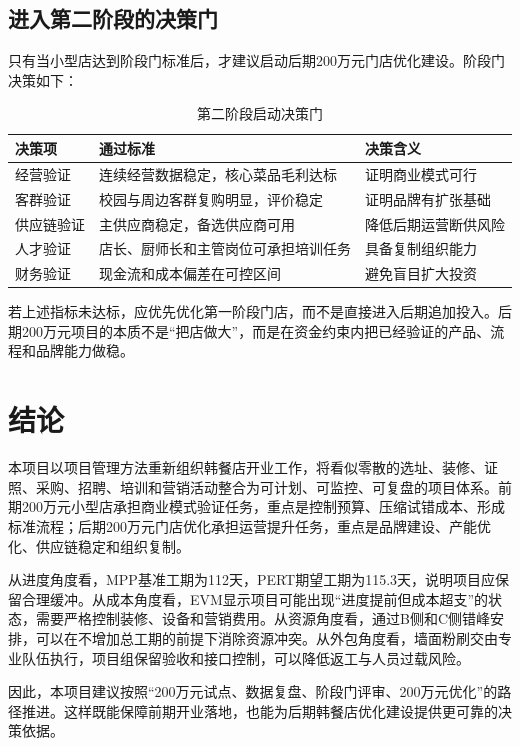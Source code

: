 \documentclass[UTF8,zihao=-4]{ctexart}
\begin{document}
\subsection{进入第二阶段的决策门}

只有当小型店达到阶段门标准后，才建议启动后期200万元门店优化建设。阶段门决策如下：

\begin{table}[H]
  \centering
  \caption{第二阶段启动决策门}
  \begin{tabularx}{\textwidth}{p{3.5cm}p{4cm}Y}
    \toprule
    决策项 & 通过标准 & 决策含义 \\
    \midrule
    经营验证 & 连续经营数据稳定，核心菜品毛利达标 & 证明商业模式可行 \\
    客群验证 & 校园与周边客群复购明显，评价稳定 & 证明品牌有扩张基础 \\
    供应链验证 & 主供应商稳定，备选供应商可用 & 降低后期运营断供风险 \\
    人才验证 & 店长、厨师长和主管岗位可承担培训任务 & 具备复制组织能力 \\
    财务验证 & 现金流和成本偏差在可控区间 & 避免盲目扩大投资 \\
    \bottomrule
  \end{tabularx}
\end{table}

若上述指标未达标，应优先优化第一阶段门店，而不是直接进入后期追加投入。后期200万元项目的本质不是“把店做大”，而是在资金约束内把已经验证的产品、流程和品牌能力做稳。

\section{结论}

本项目以项目管理方法重新组织韩餐店开业工作，将看似零散的选址、装修、证照、采购、招聘、培训和营销活动整合为可计划、可监控、可复盘的项目体系。前期200万元小型店承担商业模式验证任务，重点是控制预算、压缩试错成本、形成标准流程；后期200万元门店优化承担运营提升任务，重点是品牌建设、产能优化、供应链稳定和组织复制。

从进度角度看，MPP基准工期为112天，PERT期望工期为115.3天，说明项目应保留合理缓冲。从成本角度看，EVM显示项目可能出现“进度提前但成本超支”的状态，需要严格控制装修、设备和营销费用。从资源角度看，通过B侧和C侧错峰安排，可以在不增加总工期的前提下消除资源冲突。从外包角度看，墙面粉刷交由专业队伍执行，项目组保留验收和接口控制，可以降低返工与人员过载风险。

因此，本项目建议按照“200万元试点、数据复盘、阶段门评审、200万元优化”的路径推进。这样既能保障前期开业落地，也能为后期韩餐店优化建设提供更可靠的决策依据。
\end{document}
